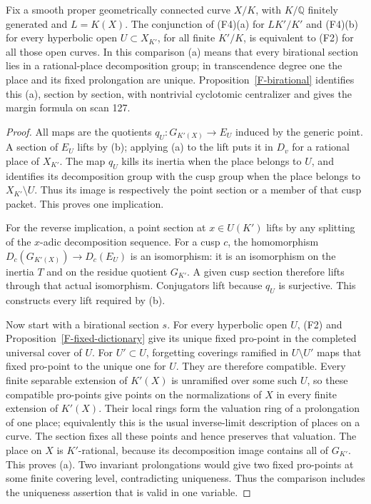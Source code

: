 \begin{proposition}
\label{F-birational-equivalence}
Fix a smooth proper geometrically connected curve $X/K$, with
$K/\mathbb Q$ finitely generated and $L=K(X)$. The conjunction
of (F4)(a) for $L K'/K'$ and (F4)(b) for every hyperbolic open
$U\subset X_{K'}$, for all finite $K'/K$, is equivalent to
(F2) for all those open curves. In this comparison (a) means
that every birational section lies in a rational-place
decomposition group; in transcendence degree one the place
and its fixed prolongation are unique. Proposition~\ref{F-birational}
identifies this (a), section by section, with nontrivial
cyclotomic centralizer and gives the margin formula on scan 127.
\end{proposition}
\begin{proof}
All maps are the quotients $q_U:G_{K'(X)}\to E_U$ induced by
the generic point. A section of $E_U$ lifts by (b); applying (a)
to the lift puts it in $D_v$ for a rational place of $X_{K'}$.
The map $q_U$ kills its inertia when the place belongs to $U$,
and identifies its decomposition group with the cusp group when
the place belongs to $X_{K'}\setminus U$. Thus its image is
respectively the point section or a member of that cusp packet.
This proves one implication.

For the reverse implication, a point section at $x\in U(K')$
lifts by any splitting of the $x$-adic decomposition sequence.
For a cusp $c$, the homomorphism $D_c(G_{K'(X)})\to D_c(E_U)$
is an isomorphism: it is an isomorphism on the inertia $T$ and
on the residue quotient $G_{K'}$. A given cusp section therefore
lifts through that actual isomorphism. Conjugators lift because
$q_U$ is surjective. This constructs every lift required by (b).

Now start with a birational section $s$. For every hyperbolic
open $U$, (F2) and Proposition~\ref{F-fixed-dictionary} give
its unique fixed pro-point in the completed universal cover of
$U$. For $U'\subset U$, forgetting coverings ramified in
$U\setminus U'$ maps that fixed pro-point to the unique one for
$U$. They are therefore compatible. Every finite separable
extension of $K'(X)$ is unramified over some such $U$, so these
compatible pro-points give points on the normalizations of $X$
in every finite extension of $K'(X)$. Their local rings form the
valuation ring of a prolongation of one place; equivalently this
is the usual inverse-limit description of places on a curve.
The section fixes all these points and hence preserves that
valuation. The place on $X$ is $K'$-rational, because its
decomposition image contains all of $G_{K'}$. This proves (a).
Two invariant prolongations would give two fixed pro-points at
some finite covering level, contradicting uniqueness. Thus the
comparison includes the uniqueness assertion that is valid in
one variable.
\end{proof}

